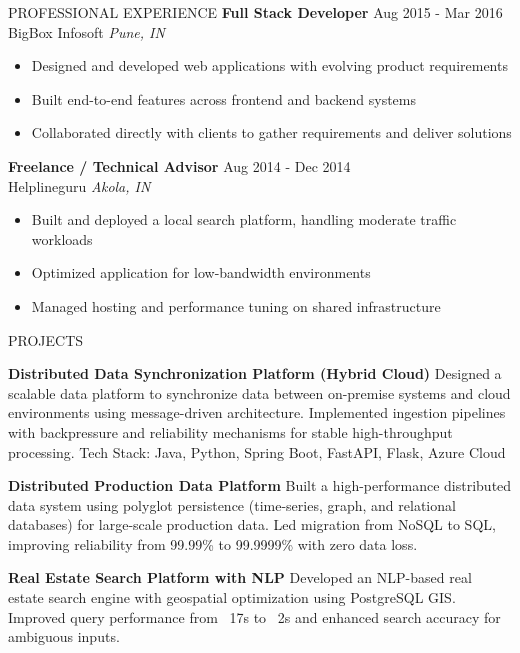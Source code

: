 \documentclass{resume} %
\begin{document}
\begin{rSection}{PROFESSIONAL EXPERIENCE}
\textbf{Full Stack Developer} \hfill Aug 2015 - Mar 2016\\
BigBox Infosoft \hfill \textit{Pune, IN}
 \begin{itemize}
    \itemsep -3pt {} 
     \item Designed and developed web applications with evolving product requirements
     \item Built end-to-end features across frontend and backend systems
     \item Collaborated directly with clients to gather requirements and deliver solutions
\end{itemize}

\textbf{Freelance / Technical Advisor} \hfill Aug 2014 - Dec 2014\\
Helplineguru \hfill \textit{Akola, IN}
 \begin{itemize}
    \itemsep -3pt {} 
     \item Built and deployed a local search platform, handling moderate traffic workloads
     \item Optimized application for low-bandwidth environments
     \item Managed hosting and performance tuning on shared infrastructure
\end{itemize}

\end{rSection} 


\begin{rSection}{PROJECTS}
\vspace{-1.25em}
\item \textbf{Distributed Data Synchronization Platform (Hybrid Cloud)} {Designed a scalable data platform to synchronize data between on-premise systems and cloud environments using message-driven architecture. Implemented ingestion pipelines with backpressure and reliability mechanisms for stable high-throughput processing.
Tech Stack: Java, Python, Spring Boot, FastAPI, Flask, Azure Cloud}
\item \textbf{Distributed Production Data Platform} {Built a high-performance distributed data system using polyglot persistence (time-series, graph, and relational databases) for large-scale production data. Led migration from NoSQL to SQL, improving reliability from 99.99\% to 99.9999\% with zero data loss.}
\item \textbf{Real Estate Search Platform with NLP} {Developed an NLP-based real estate search engine with geospatial optimization using PostgreSQL GIS. Improved query performance from ~17s to ~2s and enhanced search accuracy for ambiguous inputs.}
\end{rSection} 
\end{document}
